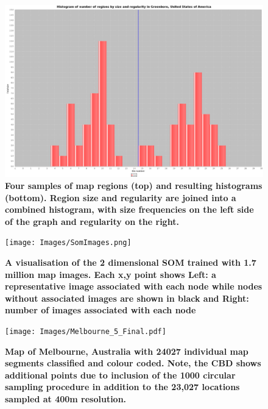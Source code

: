 \documentclass{article}
\begin{document}
\begin{figure}
\includegraphics[scale=0.06]{Images/Combinedcity1521-754459.png}
\caption{\bf Four samples of map regions (top) and resulting histograms (bottom). Region size and regularity are joined into a combined histogram, with size frequencies on the left side of the graph and regularity on the right.}    
 \label{fig:mapsandHist}  
\end{figure} 

\begin{figure}
\centering    
\texttt{[image: Images/SomImages.png]}  
\caption{\bf  A visualisation of the 2 dimensional SOM trained with 1.7 million map images.  Each x,y point shows Left: a representative image associated with each node while nodes without associated images are shown in black and Right: number of images associated with each node}    
 \label{fig:somresults}  
\end{figure} 

\begin{figure}
\centering    
\texttt{[image: Images/Melbourne\_5\_Final.pdf]}  
\caption{\bf  Map of Melbourne, Australia with 24027 individual map segments classified and colour coded. Note, the CBD shows additional points due to inclusion of the 1000 circular sampling procedure in addition to the 23,027 locations sampled at 400m resolution. }    
 \label{fig:mel23000}  
\end{figure} 
\end{document}
